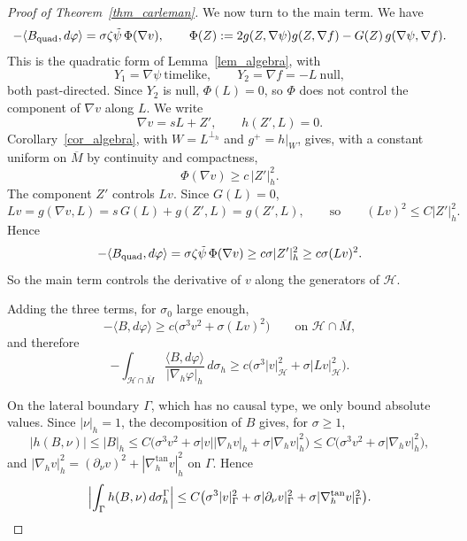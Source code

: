 \documentclass[12pt,reqno]{amsart}
\numberwithin{equation}{section}
\theoremstyle{definition}
\theoremstyle{plain}
\theoremstyle{definition}
\theoremstyle{definition}
\newcommand{\uu}{M}
\begin{document}
\begin{proof}[Proof of Theorem~\ref{thm_carleman}]
We now turn to the main term. We have
\[
-\langle B_{\rm quad},d\varphi\rangle=\sigma\zeta\tilde\psi\,\Phi(\nabla v),
\qquad
\Phi(Z):=2g(Z,\nabla\psi)g(Z,\nabla f)-G(Z)\,g(\nabla\psi,\nabla f).
\]
This is the quadratic form of Lemma~\ref{lem_algebra}, with
\[
Y_1=\nabla\psi\ \text{timelike},\qquad Y_2=\nabla f=-L\ \text{null},
\]
both past-directed. Since $Y_2$ is null, $\Phi(L)=0$, so $\Phi$ does not control the component of $\nabla v$ along $L$. We write
\[
\nabla v=sL+Z',\qquad h(Z',L)=0 .
\]
Corollary~\ref{cor_algebra}, with $W=L^{\perp_h}$ and $g^+=h|_W$, gives, with a constant uniform on $\overline\uu$ by continuity and compactness,
\[
\Phi(\nabla v)\ge c\,|Z'|_h^2 .
\]
The component $Z'$ controls $Lv$. Since $G(L)=0$,
\[
Lv=g(\nabla v,L)=s\,G(L)+g(Z',L)=g(Z',L),\qquad\text{so}\qquad (Lv)^2\le C|Z'|_h^2 .
\]
Hence
\[
-\langle B_{\rm quad},d\varphi\rangle=\sigma\zeta\tilde\psi\,\Phi(\nabla v)\ge c\sigma|Z'|_h^2\ge c\sigma(Lv)^2 .
\]
So the main term controls the derivative of $v$ along the generators of $\mathcal H$.

Adding the three terms, for $\sigma_0$ large enough,
\[
-\langle B,d\varphi\rangle\ge c\bigl(\sigma^3v^2+\sigma(Lv)^2\bigr)\qquad\text{on }\mathcal H\cap\overline\uu ,
\]
and therefore
\begin{equation}\label{eq_bdry_H}
-\int_{\mathcal H\cap\overline\uu}\frac{\langle B,d\varphi\rangle}{|\nabla_h\varphi|_h}\,d\sigma_h\ge c\bigl(\sigma^3|v|^2_{\mathcal H}+\sigma|Lv|^2_{\mathcal H}\bigr).
\end{equation}

On the lateral boundary $\Gamma$, which has no causal type, we only bound absolute values. Since $|\nu|_h=1$, the decomposition of $B$ gives, for $\sigma\ge1$,
\[
|h(B,\nu)|\le|B|_h\le C\bigl(\sigma^3v^2+\sigma|v||\nabla_h v|_h+\sigma|\nabla_h v|_h^2\bigr)\le C\bigl(\sigma^3v^2+\sigma|\nabla_h v|_h^2\bigr),
\]
and $|\nabla_h v|_h^2=(\partial_\nu v)^2+|\nabla_h^{\tan}v|_h^2$ on $\Gamma$. Hence
\begin{equation}\label{eq_bdry_Gamma}
\Bigl|\int_\Gamma h(B,\nu)\,d\sigma_h^\Gamma\Bigr|\le C\bigl(\sigma^3|v|^2_\Gamma+\sigma|\partial_\nu v|^2_\Gamma+\sigma|\nabla_h^{\tan}v|^2_\Gamma\bigr).
\end{equation}



\end{proof}
\end{document}
